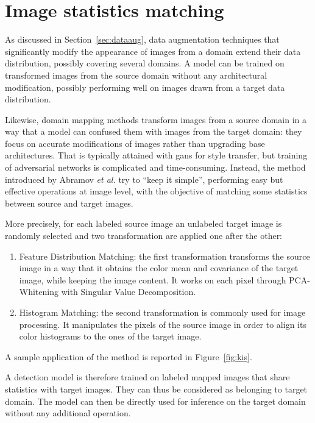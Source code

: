 \documentclass[%
    corpo=12pt,
    twoside,
    stile=classica,   
    tipotesi=magistrale,
    evenboxes,
    english,
	numerazioneromana,
]{toptesi}
\begin{document}
\section{Image statistics matching}
As discussed in Section~\ref{sec:dataaug}, data augmentation techniques that significantly modify the appearance of images from a domain extend their data distribution, possibly covering several domains. A model can be trained on transformed images from the source domain without any architectural modification, possibly performing well on images drawn from a target data distribution.

\bigskip
Likewise, domain mapping methods transform images from a source domain in a way that a model can confused them with images from the target domain: they focus on accurate modifications of images rather than upgrading base architectures. That is typically attained with \glspl{gan} for style transfer, but training of adversarial networks is complicated and time-consuming. Instead, the method introduced by Abramov \textit{et al.}\cite{abramov2020simple} try to \textquotedblleft keep it simple\textquotedblright, performing easy but effective operations at image level, with the objective of matching some statistics between source and target images.

More precisely, for each labeled source image an unlabeled target image is randomly selected and two transformation are applied one after the other:
\begin{enumerate}
	\item Feature Distribution Matching: the first transformation transforms the source image in a way that it obtains the color mean and covariance of the target image, while keeping the image content. It works on each pixel through PCA-Whitening with Singular Value Decomposition.
	\item Histogram Matching: the second transformation is commonly used for image processing. It manipulates the pixels of the source image in order to align its color histograms to the ones of the target image.
\end{enumerate}

A sample application of the method is reported in Figure~\ref{fig:kis}.

A detection model is therefore trained on labeled mapped images that share statistics with target images. They can thus be considered as belonging to target domain. The model can then be directly used for inference on the target domain without any additional operation.
\end{document}
